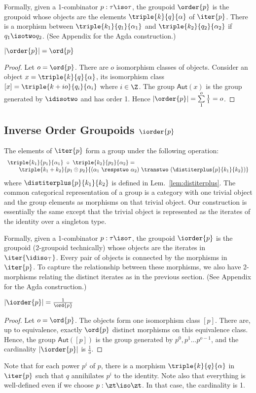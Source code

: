 Formally, given a 1-combinator $p : \tau\iso\tau$, the groupoid
$\order{p}$ is the groupoid whose objects are the elements
$\triple{k}{q}{\alpha}$ of $\iter{p}$. There is a morphism between
$\triple{k_1}{q_1}{\alpha_1}$ and $\triple{k_2}{q_2}{\alpha_2}$ if
$q_1 \isotwo q_2$. (See Appendix for the Agda construction.)

\begin{lemma}
  $|\order{p}| = \ord{p}$
\end{lemma}
\begin{proof}
  Let $o = \ord{p}$. There are $o$ isomorphism classes of
  objects. Consider an object $x = \triple{k}{q}{\alpha}$, its
  isomorphism class $[x] = \triple{k+io}{q_i}{\alpha_i}$ where
  $i \in \Z$. The group $\textsf{Aut}(x)$ is the group generated by
  $\idisotwo$ and has order 1. Hence
  $|\order{p}| = \sum\limits_{1}^{o}\frac{1}{1} = o$.
\end{proof}

\subsection{Inverse Order Groupoids $\iorder{p}$}

The elements of $\iter{p}$ form a group under the following operation:
\[\begin{array}{l}
\triple{k_1}{p_1}{\alpha_1} ~\circ~ \triple{k_2}{p_2}{\alpha_2} = \\
\qquad  \triple{k_1+k_2}{p_1 \odot p_2}{(\alpha_1 ~\respstwo~
    \alpha_2)~\transtwo~(\distiterplus{p}{k_1}{k_2})}
\end{array}\]
where $\distiterplus{p}{k_1}{k_2}$ is defined in
Lem.~\ref{lem:distiterplus}. The common categorical representation of
a group is a category with one trivial object and the group elements
as morphisms on that trivial object. Our construction is essentially
the same except that the trivial object is represented as the iterates
of the identity over a singleton type.

Formally, given a 1-combinator $p : \tau\iso\tau$, the groupoid
$\iorder{p}$ is the groupoid (2-groupoid technically) whose objects
are the iterates in $\iter{\idiso_{\top}}$. Every pair of objects is
connected by the morphisms in $\iter{p}$. To capture the relationship
between these morphisms, we also have 2-morphisms relating the
distinct iterates as in the previous section. (See Appendix for the
Agda construction.)

\begin{lemma}
  $|\iorder{p}| = \frac{1}{\ord{p}}$
\end{lemma}
\begin{proof}
  Let $o = \ord{p}$. The objects form one isomorphism class
  $[p]$. There are, up to equivalence, exactly $\ord{p}$ distinct
  morphisms on this equivalence class. Hence, the group
  $\textsf{Aut}([p])$ is the group generated by
  $p^0, p^1 \dots p^{o-1}$, and the cardinality $|\iorder{p}|$ is
  $\frac{1}{o}$.
\end{proof}

Note that for each power $p ^ i$ of $p$, there is a morphism
$\triple{k}{q}{\alpha}$ in $\iter{p}$ such that $q$ annihilates $p^i$
to the identity. Note also that everything is well-defined even if we
choose $p : \zt\iso\zt$. In that case, the cardinality is 1.
